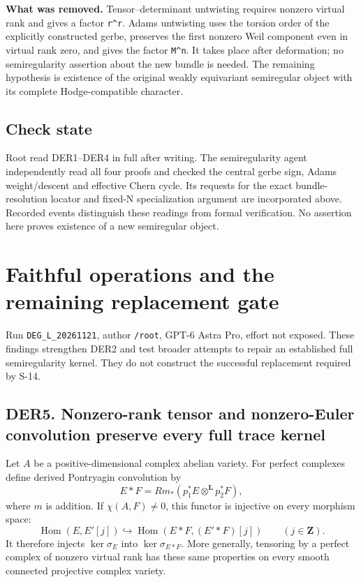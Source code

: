 \documentclass[11pt,a4paper]{article}
\theoremstyle{definition}
\begin{document}
\textbf{What was removed.} Tensor--determinant untwisting requires
nonzero virtual rank and gives a factor \texttt{r\^{}r}. Adams
untwisting uses the torsion order of the explicitly constructed gerbe,
preserves the first nonzero Weil component even in virtual rank zero,
and gives the factor \texttt{M\^{}n}. It takes place after deformation;
no semiregularity assertion about the new bundle is needed. The
remaining hypothesis is existence of the original weakly equivariant
semiregular object with its complete Hodge-compatible character.

\subsection{Check state}\label{derived-candidates-check-state}

Root read DER1--DER4 in full after writing. The semiregularity agent
independently read all four proofs and checked the central gerbe sign,
Adams weight/descent and effective Chern cycle. Its requests for the
exact bundle-resolution locator and fixed-N specialization argument are
incorporated above. Recorded events distinguish these readings from
formal verification. No assertion here proves existence of a new
semiregular object.

\section{Faithful operations and the remaining replacement gate}

Run \texttt{DEG\_L\_20261121}, author \texttt{/root}, GPT-6 Astra Pro,
effort not exposed. These findings strengthen DER2 and test broader
attempts to repair an established full semiregularity kernel. They do
not construct the successful replacement required by S-14.

\subsection{DER5. Nonzero-rank tensor and nonzero-Euler convolution
preserve every full trace
kernel}\label{derived-functors-der5.-nonzero-rank-tensor-and-nonzero-euler-convolution-preserve-every-full-trace-kernel}

Let \(A\) be a positive-dimensional complex abelian variety. For perfect
complexes define derived Pontryagin convolution by \[
 E*F=Rm_*(p_1^*E\otimes^{\mathbf L}p_2^*F),
\] where \(m\) is addition. If \(\chi(A,F)\ne0\), this functor is
injective on every morphism space: \[
 \operatorname{Hom}(E,E'[j])\hookrightarrow
 \operatorname{Hom}(E*F,(E'*F)[j])\qquad(j\in\mathbf Z).
\tag{DER5a}
\] It therefore injects \(\ker\sigma_E\) into \(\ker\sigma_{E*F}\). More
generally, tensoring by a perfect complex of nonzero virtual rank has
these same properties on every smooth connected projective complex
variety.
\end{document}
